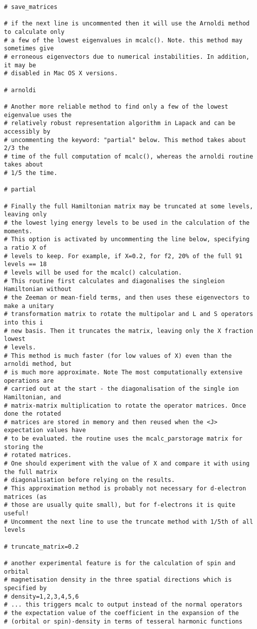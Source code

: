 {\begin{verbatim}
# save_matrices

# if the next line is uncommented then it will use the Arnoldi method to calculate only 
# a few of the lowest eigenvalues in mcalc(). Note. this method may sometimes give 
# erroneous eigenvectors due to numerical instabilities. In addition, it may be 
# disabled in Mac OS X versions.

# arnoldi

# Another more reliable method to find only a few of the lowest eigenvalue uses the 
# relatively robust representation algorithm in Lapack and can be accessibly by 
# uncommenting the keyword: "partial" below. This method takes about 2/3 the
# time of the full computation of mcalc(), whereas the arnoldi routine takes about
# 1/5 the time.

# partial

# Finally the full Hamiltonian matrix may be truncated at some levels, leaving only
# the lowest lying energy levels to be used in the calculation of the moments.
# This option is activated by uncommenting the line below, specifying a ratio X of
# levels to keep. For example, if X=0.2, for f2, 20% of the full 91 levels == 18
# levels will be used for the mcalc() calculation.
# This routine first calculates and diagonalises the singleion Hamiltonian without 
# the Zeeman or mean-field terms, and then uses these eigenvectors to make a unitary 
# transformation matrix to rotate the multipolar and L and S operators into this i
# new basis. Then it truncates the matrix, leaving only the X fraction lowest 
# levels.
# This method is much faster (for low values of X) even than the arnoldi method, but
# is much more approximate. Note The most computationally extensive operations are 
# carried out at the start - the diagonalisation of the single ion Hamiltonian, and
# matrix-matrix multiplication to rotate the operator matrices. Once done the rotated 
# matrices are stored in memory and then reused when the <J> expectation values have 
# to be evaluated. the routine uses the mcalc_parstorage matrix for storing the 
# rotated matrices.
# One should experiment with the value of X and compare it with using the full matrix 
# diagonalisation before relying on the results. 
# This approximation method is probably not necessary for d-electron matrices (as 
# those are usually quite small), but for f-electrons it is quite useful!
# Uncomment the next line to use the truncate method with 1/5th of all levels

# truncate_matrix=0.2

# another experimental feature is for the calculation of spin and orbital 
# magnetisation density in the three spatial directions which is specified by
# density=1,2,3,4,5,6
# ... this triggers mcalc to output instead of the normal operators
# the expectation value of the coefficient in the expansion of the 
# (orbital or spin)-density in terms of tesseral harmonic functions


\end{verbatim}}
